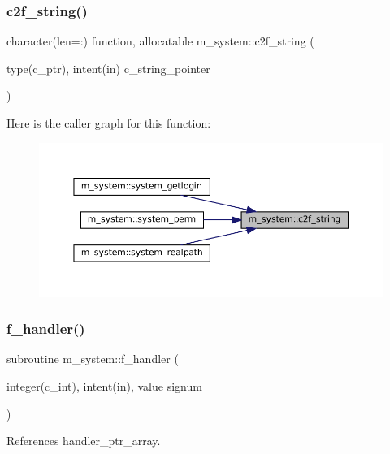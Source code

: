 \subsubsection{\texorpdfstring{c2f\+\_\+string()}{c2f\_string()}}
{\footnotesize\ttfamily character(len=\+:) function, allocatable m\+\_\+system\+::c2f\+\_\+string (\begin{DoxyParamCaption}\item[{type(c\+\_\+ptr), intent(in)}]{c\+\_\+string\+\_\+pointer }\end{DoxyParamCaption})\hspace{0.3cm}{\ttfamily [private]}}

Here is the caller graph for this function\+:\nopagebreak
\begin{figure}[H]
\begin{center}
\leavevmode
\includegraphics[width=350pt]{namespacem__system_aa7c5445619aa15cd2301fe17f7c3b73c_icgraph}
\end{center}
\end{figure}
\mbox{\label{namespacem__system_a078c9adfb12b36e88534248e99ed9fcc}} 
\subsubsection{\texorpdfstring{f\+\_\+handler()}{f\_handler()}}
{\footnotesize\ttfamily subroutine m\+\_\+system\+::f\+\_\+handler (\begin{DoxyParamCaption}\item[{integer(c\+\_\+int), intent(in), value}]{signum }\end{DoxyParamCaption})\hspace{0.3cm}{\ttfamily [private]}}



References handler\+\_\+ptr\+\_\+array.

